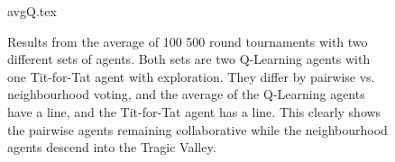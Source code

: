 \begin{figure} [ht]
\begin{center}
 {avgQ.tex} 
\end {center}
\caption{Results from the average of 100  500 round tournaments with two
  different sets of agents.  Both sets are two Q-Learning agents with
  one Tit-for-Tat agent with exploration.  They differ by pairwise
  vs. neighbourhood voting, and the average of the Q-Learning agents
  have a line, and the Tit-for-Tat agent has a line.  
  This clearly shows the pairwise agents remaining collaborative while
  the neighbourhood agents descend into the Tragic Valley.}
  \label{figQAverage}
\end {figure}
